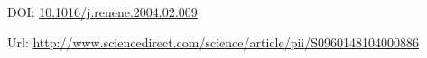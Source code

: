 \documentclass[a4paper,12pt]{article}
\begin{document}
\thispagestyle{empty}

\vspace{3cm}

\nocite{Bianchi2004a}
\printbibliography

\vspace{3cm}
DOI: \href{http://dx.doi.org/10.1016/j.renene.2004.02.009}{10.1016/j.renene.2004.02.009}

\vspace{1.5cm}
Url: \url{http://www.sciencedirect.com/science/article/pii/S0960148104000886}

\newpage

\end{document}

